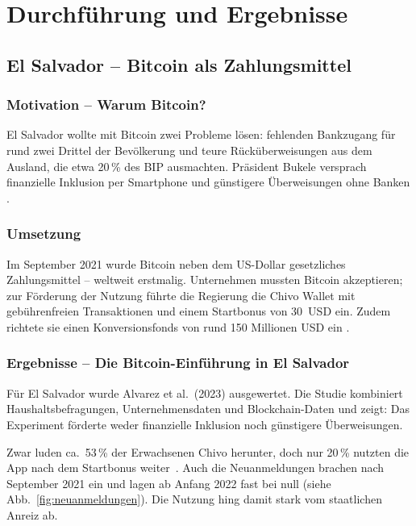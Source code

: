 \chapter{Durchführung und Ergebnisse}
\label{chap:kern}
\section{El Salvador -- Bitcoin als Zahlungsmittel}

\subsection{Motivation -- Warum Bitcoin?}

El Salvador wollte mit Bitcoin zwei Probleme lösen: fehlenden Bankzugang für rund zwei Drittel der Bevölkerung und teure Rücküberweisungen aus dem Ausland, die etwa 20\,\% des BIP ausmachten. Präsident Bukele versprach finanzielle Inklusion per Smartphone und günstigere Überweisungen ohne Banken \cite{Alvarez2023}.

\subsection{Umsetzung}

Im September 2021 wurde Bitcoin neben dem US-Dollar gesetzliches Zahlungsmittel -- weltweit erstmalig. Unternehmen mussten Bitcoin akzeptieren; zur Förderung der Nutzung führte die Regierung die Chivo Wallet mit gebührenfreien Transaktionen und einem Startbonus von 30~USD ein. Zudem richtete sie einen Konversionsfonds von rund 150 Millionen USD ein \cite{Alvarez2023}.

\subsection{Ergebnisse -- Die Bitcoin-Einführung in El Salvador}

Für El Salvador wurde Alvarez et al.\ (2023) ausgewertet. Die Studie kombiniert Haushaltsbefragungen, Unternehmensdaten und Blockchain-Daten und zeigt: Das Experiment förderte weder finanzielle Inklusion noch günstigere Überweisungen.

Zwar luden ca.\ 53\,\% der Erwachsenen Chivo herunter, doch nur 20\,\% nutzten die App nach dem Startbonus weiter~\cite{Alvarez2023}. Auch die Neuanmeldungen brachen nach September 2021 ein und lagen ab Anfang 2022 fast bei null (siehe Abb.~\ref{fig:neuanmeldungen}). Die Nutzung hing damit stark vom staatlichen Anreiz ab.

